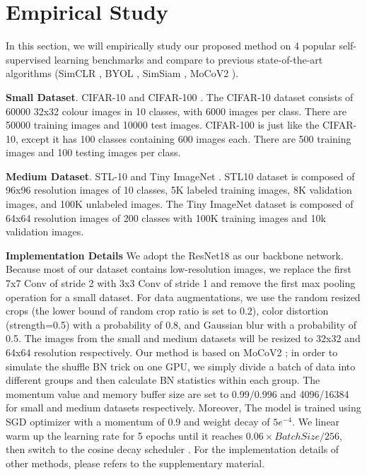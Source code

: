 \documentclass{article}
\newcommand{\<}{\left\langle}
\renewcommand{\>}{\right\rangle}
\begin{document}
 \vspace{-10pt}
\section{Empirical Study}
\vspace{-10pt}
In this section, we will empirically study our proposed method on 4 popular self-supervised learning benchmarks and compare to previous state-of-the-art algorithms (SimCLR \cite{simclr}, BYOL \cite{byol}, SimSiam \cite{SimSiam}, MoCoV2 \cite{mocov2}).

\textbf{Small Dataset}.
CIFAR-10 and CIFAR-100 \cite{cifar}. The CIFAR-10 dataset consists of 60000 32x32 colour images in 10 classes, with 6000 images per class. There are 50000 training images and 10000 test images. CIFAR-100 is just like the CIFAR-10, except it has 100 classes containing 600 images each. There are 500 training images and 100 testing images per class.

\textbf{Medium Dataset}.
STL-10 \cite{stl10} and Tiny ImageNet \cite{tinyImagenet}. STL10 \cite{stl10} dataset is composed of 96x96 resolution images of 10 classes, 5K labeled training images, 8K validation images, and 100K unlabeled images. The Tiny ImageNet dataset is composed of 64x64 resolution images of 200 classes with 100K training images and 10k validation images.


\textbf{Implementation Details}
We adopt the ResNet18 \cite{resnet} as our backbone network. Because most of our dataset contains low-resolution images, we replace the first 7x7 Conv of stride 2 with 3x3 Conv of stride 1 and remove the first max pooling operation for a small dataset. For data augmentations, we use the random resized crops (the lower bound of random crop ratio is set to 0.2), color distortion (strength=0.5) with a probability of 0.8, and Gaussian blur with a probability of 0.5. The images from the small and medium datasets will be resized to 32x32 and 64x64 resolution respectively. Our method is based on MoCoV2 \cite{mocov2}; in order to simulate the shuffle BN trick on one GPU, we simply divide a batch of data into different groups and then calculate BN statistics within each group. The momentum value and memory buffer size are set to 0.99/0.996 and 4096/16384 for small and medium datasets respectively. Moreover, The model is trained using SGD optimizer with a momentum of 0.9 and weight decay of $5e^{-4}$. We linear warm up the learning rate for 5 epochs until it reaches $0.06 \times BatchSize / 256$, then switch to the cosine decay scheduler  \cite{cosine_lr}. For the implementation details of other methods, please refers to the supplementary material.
\end{document}
